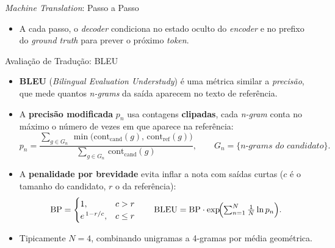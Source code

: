 \documentclass[aspectratio=169,xcolor=dvipsnames]{beamer}
\begin{document}
\begin{frame}{\textit{Machine Translation}: Passo a Passo}
\begin{itemize}
    \item A cada passo, o \textit{decoder} condiciona no estado oculto do \textit{encoder} e no prefixo do \textit{ground truth} para prever o próximo \textit{token}.
\end{itemize}
\centering
{}%
%
%
%

\vspace{0.2em}
\end{frame}

\begin{frame}{Avaliação de Tradução: BLEU}
\setlength{\abovedisplayskip}{2pt}\setlength{\belowdisplayskip}{2pt}
\begin{itemize}
    \item \textbf{BLEU} (\textit{Bilingual Evaluation Understudy}) é uma métrica similar a \textit{precisão}, que mede quantos \textit{n-grams} da saída aparecem no texto de referência.
    \item A \textbf{precisão modificada} $p_n$ usa contagens \textbf{clipadas}, cada \textit{n-gram} conta no máximo o número de vezes em que aparece na referência:
    \begin{equation*}
        p_n = \frac{\sum_{g \in G_n}\, \min\bigl(\text{cont}_{\text{cand}}(g),\, \text{cont}_{\text{ref}}(g)\bigr)}{\sum_{g \in G_n}\, \text{cont}_{\text{cand}}(g)}, \qquad G_n = \{\textit{n-grams do candidato}\}.
    \end{equation*}
    \item A \textbf{penalidade por brevidade} evita inflar a nota com saídas curtas ($c$ é o tamanho do candidato, $r$ o da referência):
    \begin{equation*}
        \text{BP} = \begin{cases} 1, & c > r \\ e^{\,1 - r/c}, & c \le r \end{cases}
        \qquad
        \text{BLEU} = \text{BP}\cdot \exp\!\Bigl(\textstyle\sum_{n=1}^{N} \tfrac{1}{N}\ln p_n\Bigr).
    \end{equation*}
    \item Tipicamente $N = 4$, combinando unigramas a 4-gramas por média geométrica.
\end{itemize}
\end{frame}
\end{document}
